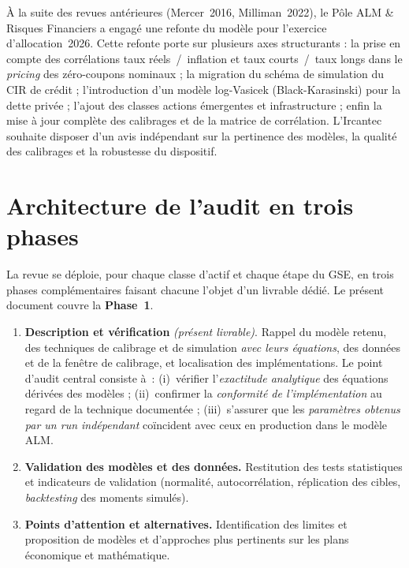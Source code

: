 \documentclass[11pt,a4paper]{article}
\begin{document}
À la suite des revues antérieures (Mercer~2016, Milliman~2022), le Pôle ALM \& Risques Financiers a engagé une refonte du modèle pour l'exercice d'allocation~2026. Cette refonte porte sur plusieurs axes structurants : la prise en compte des corrélations taux réels~/~inflation et taux courts~/~taux longs dans le \emph{pricing} des zéro-coupons nominaux ; la migration du schéma de simulation du CIR de crédit ; l'introduction d'un modèle log-Vasicek (Black-Karasinski) pour la dette privée ; l'ajout des classes actions émergentes et infrastructure ; enfin la mise à jour complète des calibrages et de la matrice de corrélation. L'Ircantec souhaite disposer d'un avis indépendant sur la pertinence des modèles, la qualité des calibrages et la robustesse du dispositif.

\section{Architecture de l'audit en trois phases}

La revue se déploie, pour chaque classe d'actif et chaque étape du GSE, en trois phases complémentaires faisant chacune l'objet d'un livrable dédié. Le présent document couvre la \textbf{Phase~1}.

\begin{enumerate}[label=\textbf{\color{nxred}Phase~\arabic*.}]
  \item \textbf{Description et vérification} \emph{(présent livrable)}. Rappel du modèle retenu, des techniques de calibrage et de simulation \emph{avec leurs équations}, des données et de la fenêtre de calibrage, et localisation des implémentations. Le point d'audit central consiste à~: (i)~vérifier l'\emph{exactitude analytique} des équations dérivées des modèles ; (ii)~confirmer la \emph{conformité de l'implémentation} au regard de la technique documentée ; (iii)~s'assurer que les \emph{paramètres obtenus par un \emph{run} indépendant} coïncident avec ceux en production dans le modèle ALM.
  \item \textbf{Validation des modèles et des données.} Restitution des tests statistiques et indicateurs de validation (normalité, autocorrélation, réplication des cibles, \emph{backtesting} des moments simulés).
  \item \textbf{Points d'attention et alternatives.} Identification des limites et proposition de modèles et d'approches plus pertinents sur les plans économique et mathématique.
\end{enumerate}
\end{document}
